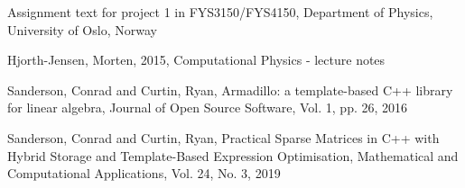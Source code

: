 \documentclass[a4paper,english]{article}
\begin{document}
\begin{thebibliography}{}
    Assignment text for project 1 in FYS3150/FYS4150,
    Department of Physics, University of Oslo, Norway

    Hjorth-Jensen, Morten,
    2015,
    Computational Physics - lecture notes

    Sanderson, Conrad and Curtin, Ryan,
    Armadillo: a template-based C++ library for linear algebra,
    Journal of Open Source Software, Vol. 1, pp. 26, 2016

    Sanderson, Conrad and Curtin, Ryan,
    Practical Sparse Matrices in C++ with Hybrid Storage and Template-Based Expression Optimisation,
    Mathematical and Computational Applications, Vol. 24, No. 3, 2019
\end{thebibliography}
\end{document}
